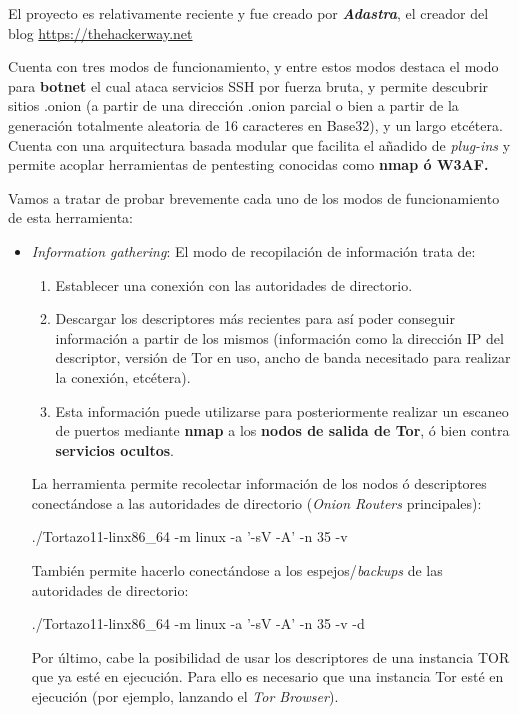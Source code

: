 El proyecto es relativamente reciente y fue creado por \textbf{\textit{Adastra}}, el creador del blog \url{https://thehackerway.net}

Cuenta con tres modos de funcionamiento, y entre estos modos destaca el modo para \textbf{botnet} el cual ataca servicios SSH por fuerza bruta, y permite descubrir sitios .onion (a partir de una dirección .onion parcial o bien a partir de la generación totalmente aleatoria de 16 caracteres en Base32), y un largo etcétera. Cuenta con una arquitectura basada modular que facilita el añadido de \textit{plug-ins} y permite acoplar herramientas de pentesting conocidas como \textbf{nmap ó W3AF.}

Vamos a tratar de probar brevemente cada uno de los modos de funcionamiento de esta herramienta:

\begin{itemize}
	\item{\textit{Information gathering}}: El modo de recopilación de información trata de:
	\begin{enumerate}
		\item Establecer una conexión con las autoridades de directorio.
		\item Descargar los descriptores más recientes para así poder conseguir información a partir de los mismos (información como  la dirección IP del descriptor, versión de Tor en uso, ancho de banda necesitado para realizar la conexión, etcétera). 
		\item Esta información puede utilizarse para posteriormente realizar un escaneo de puertos mediante \textbf{nmap} a los \textbf{nodos de salida de Tor}, ó bien contra \textbf{servicios ocultos}. 
	\end{enumerate}
	
	La herramienta permite recolectar información de los nodos ó descriptores conectándose a las autoridades de directorio (\textit{Onion Routers} principales):
	
	{\selectfont 
		./Tortazo11-linx86\_64 -m linux -a '-sV -A' -n 35 -v
	}
	
	También permite hacerlo conectándose a los espejos/\textit{backups} de las autoridades de directorio:
	
	{\selectfont 
		./Tortazo11-linx86\_64 -m linux -a '-sV -A' -n 35 -v -d
	}
	
	Por último, cabe la posibilidad de usar los descriptores de una instancia TOR que ya esté en ejecución. Para ello es necesario que una instancia Tor esté en ejecución (por ejemplo, lanzando el \textit{Tor Browser}).
	

\end{itemize}
